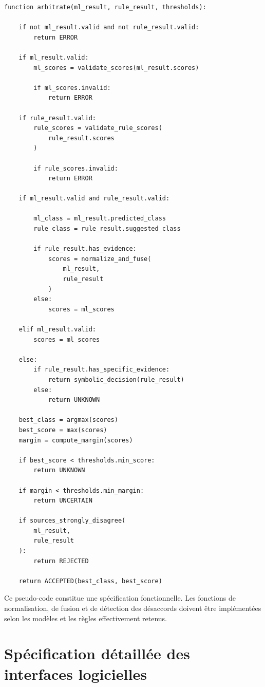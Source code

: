 \begin{verbatim}
function arbitrate(ml_result, rule_result, thresholds):

    if not ml_result.valid and not rule_result.valid:
        return ERROR

    if ml_result.valid:
        ml_scores = validate_scores(ml_result.scores)

        if ml_scores.invalid:
            return ERROR

    if rule_result.valid:
        rule_scores = validate_rule_scores(
            rule_result.scores
        )

        if rule_scores.invalid:
            return ERROR

    if ml_result.valid and rule_result.valid:

        ml_class = ml_result.predicted_class
        rule_class = rule_result.suggested_class

        if rule_result.has_evidence:
            scores = normalize_and_fuse(
                ml_result,
                rule_result
            )
        else:
            scores = ml_scores

    elif ml_result.valid:
        scores = ml_scores

    else:
        if rule_result.has_specific_evidence:
            return symbolic_decision(rule_result)
        else:
            return UNKNOWN

    best_class = argmax(scores)
    best_score = max(scores)
    margin = compute_margin(scores)

    if best_score < thresholds.min_score:
        return UNKNOWN

    if margin < thresholds.min_margin:
        return UNCERTAIN

    if sources_strongly_disagree(
        ml_result,
        rule_result
    ):
        return REJECTED

    return ACCEPTED(best_class, best_score)
\end{verbatim}

Ce pseudo-code constitue une spécification fonctionnelle. Les fonctions de normalisation, de fusion et de détection des désaccords doivent être implémentées selon les modèles et les règles effectivement retenus.

\section{Spécification détaillée des interfaces logicielles}

